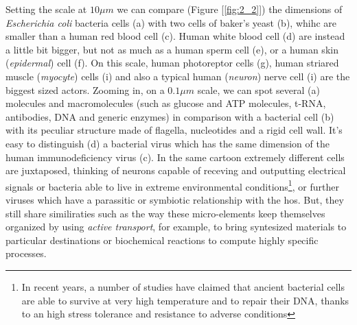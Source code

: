 \documentclass[../main/main.tex]{subfiles}
\begin{document}
Setting the scale at $10\mu m$ we can compare (Figure [\ref{fig:2_2}]) the dimensions of \emph{Escherichia coli} bacteria cells (a) with two cells of baker's yeast (b), whihc are smaller than a human red blood cell (c). Human white blood cell (d) are instead a little bit bigger, but not as much as a human sperm cell (e), or a human skin (\emph{epidermal}) cell (f). On this scale, human photoreptor cells (g), human striared muscle (\emph{myocyte}) cells (i) and also a typical human (\emph{neuron}) nerve cell (i) are the biggest sized actors. Zooming in, on a $0.1\mu m$ scale, we can spot several (a) molecules and macromolecules (such as glucose and ATP molecules, t-RNA, antibodies, DNA and generic enzymes) in comparison with a bacterial cell (b) with its peculiar structure made of flagella, nucleotides and a rigid cell wall. It's easy to distinguish (d) a bacterial virus which has the same dimension of the human immunodeficiency virus (c). 
In the same cartoon extremely different cells are juxtaposed, thinking of neurons capable of receving and outputting electrical signals or bacteria able to live in extreme environmental conditions\footnote{In recent years, a number of studies have claimed that ancient bacterial cells are able to survive at very high temperature and to repair their DNA, thanks to an high stress tolerance and resistance to adverse conditions\cite{bacteria}}, or further viruses which have a parassitic or symbiotic relationship with the hos. But, they still share similiraties such as the way these micro-elements keep themselves organized by using \emph{active transport}, for example, to bring syntesized materials to particular destinations or biochemical reactions to compute highly specific processes.   
\end{document}

